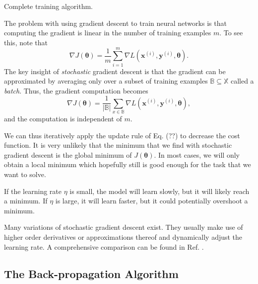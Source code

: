 Complete training algorithm.

The problem with using gradient descent to train neural networks is that computing the gradient is linear in the number of training examples $m$. To see this, note that
\begin{equation}
\nabla J(\bm{\theta}) = \frac1{m}\sum_{i=1}^{m}\nabla L(\bm{x}^{(i)},\bm{y}^{(i)},\bm{\theta}).
\end{equation}
The key insight of \emph{stochastic} gradient descent is that the gradient can be approximated by averaging only over a subset of training examples $\mathbb{B} \subseteq \mathbb{X}$ called a \emph{batch}. Thus, the gradient computation becomes
\begin{equation}
\nabla J(\bm{\theta}) = \frac1{|\mathbb{B}|}\sum_{x\in\mathbb{B}}\nabla L(\bm{x}^{(i)},\bm{y}^{(i)},\bm{\theta}),
\end{equation}
and the computation is independent of $m$.

We can thus iteratively apply the update rule of Eq. (??) to decrease the cost function. It is very unlikely that the minimum that we find with stochastic gradient descent is the global minimum of $J(\bm{\theta})$. In most cases, we will only obtain a local minimum which hopefully still is good enough for the task that we want to solve.

If the learning rate $\eta$ is small, the model will learn slowly, but it will likely reach a minimum. If $\eta$ is large, it will learn faster, but it could potentially overshoot a minimum.

Many variations of stochastic gradient descent exist. They usually make use of higher order derivatives or approximations thereof and dynamically adjust the learning rate. A comprehensive comparison can be found in Ref. .

\subsection{The Back-propagation Algorithm}
